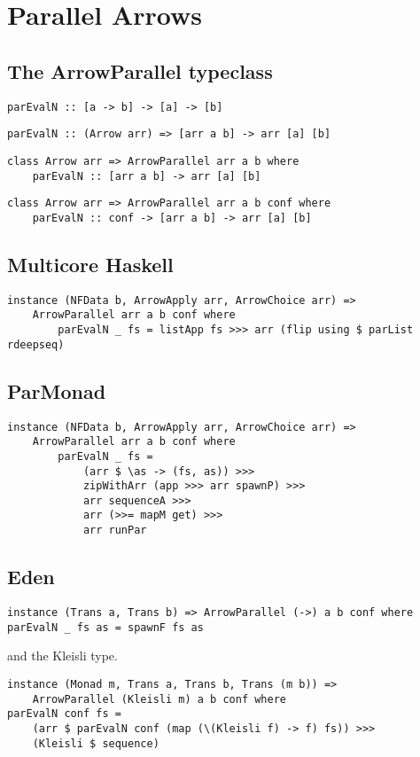 \section{Parallel Arrows}
\subsection{The ArrowParallel typeclass}
\begin{lstlisting}[frame=htrbl]
parEvalN :: [a -> b] -> [a] -> [b]
\end{lstlisting}

\begin{lstlisting}[frame=htrbl]
parEvalN :: (Arrow arr) => [arr a b] -> arr [a] [b]
\end{lstlisting}

\frbreak

\begin{lstlisting}[frame=htrbl]
class Arrow arr => ArrowParallel arr a b where
	parEvalN :: [arr a b] -> arr [a] [b]
\end{lstlisting}
\begin{lstlisting}[frame=htrbl]
class Arrow arr => ArrowParallel arr a b conf where
	parEvalN :: conf -> [arr a b] -> arr [a] [b]
\end{lstlisting}

\frbreak

\subsection{Multicore Haskell}
\begin{lstlisting}[frame=htrbl]
instance (NFData b, ArrowApply arr, ArrowChoice arr) =>
	ArrowParallel arr a b conf where
		parEvalN _ fs = listApp fs >>> arr (flip using $ parList rdeepseq)
\end{lstlisting}

\frbreak
\subsection{ParMonad}
\begin{lstlisting}[frame=htrbl]
instance (NFData b, ArrowApply arr, ArrowChoice arr) =>
	ArrowParallel arr a b conf where
		parEvalN _ fs = 
			(arr $ \as -> (fs, as)) >>>
			zipWithArr (app >>> arr spawnP) >>>
			arr sequenceA >>>
			arr (>>= mapM get) >>>
			arr runPar
\end{lstlisting}

\frbreak
\subsection{Eden}
\begin{lstlisting}[frame=htrbl]
instance (Trans a, Trans b) => ArrowParallel (->) a b conf where
parEvalN _ fs as = spawnF fs as
\end{lstlisting}
and the Kleisli type.
\begin{lstlisting}[frame=htrbl]
instance (Monad m, Trans a, Trans b, Trans (m b)) =>
	ArrowParallel (Kleisli m) a b conf where
parEvalN conf fs =
	(arr $ parEvalN conf (map (\(Kleisli f) -> f) fs)) >>>
	(Kleisli $ sequence)
\end{lstlisting}


